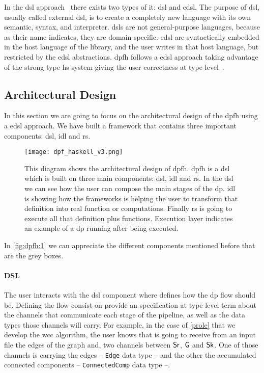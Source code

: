 In the \acrlong{dsl} approach~\cite{dsl} there exists two types of it: \acrlong{dsl} and \acrfull{edsl}. The purpose of \acrshort{dsl}, usually called external \acrshort{dsl}, is to create a completely new language with its own semantic, syntax, and interpreter. 
\acrshort{dsl}s are not general-purpose languages, because as their name indicates, they are domain-specific. \acrshort{edsl} are syntactically embedded in the host language of the library, and the user writes in that host language, but restricted by the \acrshort{edsl} abstractions.
\acrshort{dpfh} follows a \acrshort{edsl} approach taking advantage of the strong type \acrshort{hs} system giving the user correctness at type-level~\cite{curryhoward}.

\subsection{Architectural Design}
In this section we are going to focus on the architectural design of the \acrshort{dpfh} using a \acrshort{edsl} approach. We have built a framework that contains
three important components: \acrshort{dsl}, \acrshort{idl} and \acrshort{rs}. 

\begin{figure}[!ht]
  \centering
   \texttt{[image: dpf\_haskell\_v3.png]}
    \caption[{[\acrshort{dpfh}] Architectural design of \acrshort{dpfh}}]{This diagram shows the architectural design of \acrshort{dpfh}. \acrshort{dpfh} is a \acrshort{dsl} which is built on three main components: \acrshort{dsl}, \acrshort{idl} and \acrshort{rs}. In the \acrshort{dsl} we can see how the user can compose the main stages of the \acrshort{dp}. \acrshort{idl} is showing how the frameworks is helping the user to transform that definition into real function or computations. Finally \acrshort{rs} is going to execute all that definition plus functions. Execution layer indicates an example of a \acrshort{dp} running after being executed.}
    \label{fig:dpfh:1}
\end{figure}

In \autoref{fig:dpfh:1} we can appreciate the different components mentioned before that are the grey boxes.

\paragraph{DSL} The user interacts with the \acrshort{dsl} component where defines how the \acrshort{dp} flow
should be. Defining the flow consist on provide an specification at type-level term about the channels that communicate each stage of the pipeline, as well as the data types those channels will carry. 
For example, in the case of \autoref{prole} that we develop the \acrshort{wcc} algorithm, the user knows that is going to receive from an input file 
the edges of the graph and, two channels between $\mathsf{Sr}$, $\mathsf{G}$ and $\mathsf{Sk}$. One of those channels is carrying the edges -- \texttt{Edge} data type -- and the other the accumulated connected components -- \texttt{ConnectedComp} data type --. 

